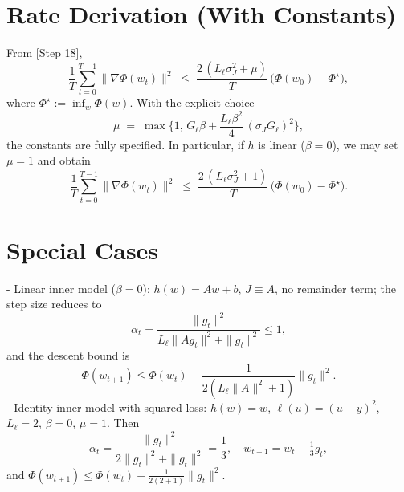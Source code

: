 \documentclass[11pt]{article}
\begin{document}
\section*{Rate Derivation (With Constants)}
From [Step 18],
\[
\frac{1}{T}\sum_{t=0}^{T-1}\|\nabla \Phi(w_t)\|^2 
\;\le\; \frac{2\,(L_\ell \sigma_J^2 + \mu)}{T}\,\big(\Phi(w_0)-\Phi^\star\big),
\]
where $\Phi^\star:=\inf_w \Phi(w)$. With the explicit choice
\[
\mu \;=\; \max\!\Big\{1,\, G_\ell \beta + \frac{L_\ell \beta^2}{4}\,(\sigma_J G_\ell)^2\Big\},
\]
the constants are fully specified. In particular, if $h$ is linear ($\beta=0$), we may set $\mu=1$ and obtain
\[
\frac{1}{T}\sum_{t=0}^{T-1}\|\nabla \Phi(w_t)\|^2 
\;\le\; \frac{2\,(L_\ell \sigma_J^2 + 1)}{T}\,\big(\Phi(w_0)-\Phi^\star\big).
\]

\section*{Special Cases}
- Linear inner model ($\beta=0$): $h(w)=Aw+b$, $J\equiv A$, no remainder term; the step size reduces to
\[
\alpha_t = \frac{\|g_t\|^2}{L_\ell \|A g_t\|^2 + \|g_t\|^2} \le 1,
\]
and the descent bound is
\[
\Phi(w_{t+1}) \le \Phi(w_t) - \frac{1}{2(L_\ell \|A\|^2+1)}\|g_t\|^2.
\]
- Identity inner model with squared loss: $h(w)=w$, $\ell(u)=(u-y)^2$, $L_\ell=2$, $\beta=0$, $\mu=1$. Then
\[
\alpha_t = \frac{\|g_t\|^2}{2\|g_t\|^2 + \|g_t\|^2} = \frac{1}{3},\quad
w_{t+1} = w_t - \tfrac{1}{3} g_t,
\]
and $\Phi(w_{t+1})\le \Phi(w_t) - \frac{1}{2(2+1)}\|g_t\|^2$.
\end{document}

